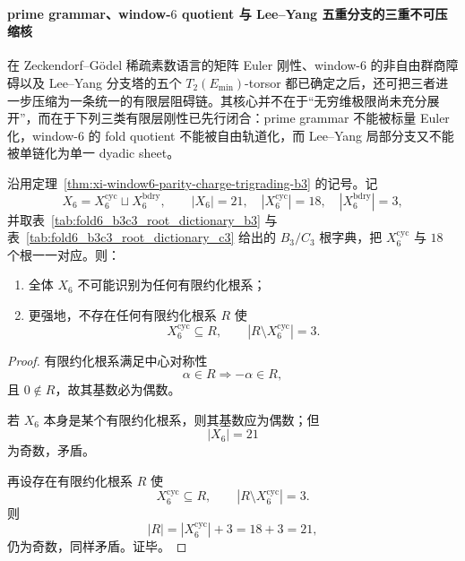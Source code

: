 \paragraph{prime grammar、window-\texorpdfstring{$6$}{6} quotient 与 Lee--Yang 五重分支的三重不可压缩核}
在 Zeckendorf--G\"odel 稀疏素数语言的矩阵 Euler 刚性、window-\(6\) 的非自由群商障碍以及 Lee--Yang 分支塔的五个 \(T_2(E_{\min})\)-torsor 都已确定之后，还可把三者进一步压缩为一条统一的有限层阻碍链。其核心并不在于“无穷维极限尚未充分展开”，而在于下列三类有限层刚性已先行闭合：prime grammar 不能被标量 Euler 化，window-\(6\) 的 fold quotient 不能被自由轨道化，而 Lee--Yang 局部分支又不能被单链化为单一 dyadic sheet。

\begin{theorem}\label{thm:xi-time-part9zp-window6-odd-residual-root-closure-obstruction}
沿用定理~\ref{thm:xi-window6-parity-charge-trigrading-b3} 的记号。记
\[
X_6=X_6^{\mathrm{cyc}}\sqcup X_6^{\mathrm{bdry}},
\qquad
|X_6|=21,\quad |X_6^{\mathrm{cyc}}|=18,\quad |X_6^{\mathrm{bdry}}|=3,
\]
并取表~\ref{tab:fold6_b3c3_root_dictionary_b3} 与表~\ref{tab:fold6_b3c3_root_dictionary_c3} 给出的 \(B_3/C_3\) 根字典，把 \(X_6^{\mathrm{cyc}}\) 与 \(18\) 个根一一对应。则：
\begin{enumerate}
  \item 全体 \(X_6\) 不可能识别为任何有限约化根系；
  \item 更强地，不存在任何有限约化根系 \(R\) 使
  \[
  X_6^{\mathrm{cyc}}\subseteq R,
  \qquad
  |R\setminus X_6^{\mathrm{cyc}}|=3.
  \]
\end{enumerate}
\end{theorem}
\begin{proof}
有限约化根系满足中心对称性
\[
\alpha\in R\Longrightarrow -\alpha\in R,
\]
且 \(0\notin R\)，故其基数必为偶数。

若 \(X_6\) 本身是某个有限约化根系，则其基数应为偶数；但
\[
|X_6|=21
\]
为奇数，矛盾。

再设存在有限约化根系 \(R\) 使
\[
X_6^{\mathrm{cyc}}\subseteq R,
\qquad
|R\setminus X_6^{\mathrm{cyc}}|=3.
\]
则
\[
|R|=|X_6^{\mathrm{cyc}}|+3=18+3=21,
\]
仍为奇数，同样矛盾。证毕。
\end{proof}


